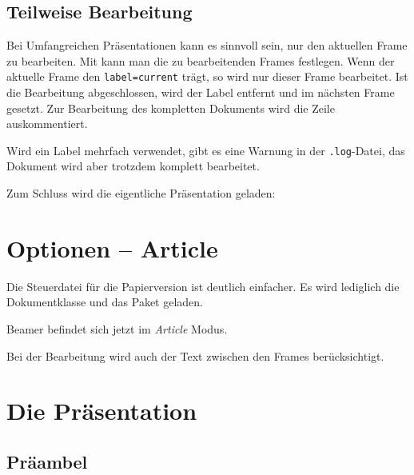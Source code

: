 \subsection{Teilweise Bearbeitung}

Bei Umfangreichen Präsentationen kann es sinnvoll sein, nur den aktuellen
Frame zu bearbeiten.  Mit  kann man die zu
bearbeitenden Frames festlegen.  Wenn der aktuelle Frame den
\texttt{label=current} trägt, so wird nur dieser Frame bearbeitet.  Ist die
Bearbeitung abgeschlossen, wird der Label entfernt und im nächsten Frame
gesetzt.  Zur Bearbeitung des kompletten Dokuments wird die Zeile
auskommentiert.

Wird ein Label mehrfach verwendet, gibt es eine Warnung in der
\texttt{.log}-Datei, das Dokument wird aber trotzdem komplett bearbeitet.

\begin{lfgwcode}{}
\end{lfgwcode}

Zum Schluss wird die eigentliche Präsentation geladen:

\begin{lfgwcode}{}

\end{lfgwcode}

\section{Optionen -- Article}

Die Steuerdatei für die Papierversion ist deutlich einfacher. Es wird
lediglich die Dokumentklasse und das Paket  geladen.

Beamer befindet sich jetzt im \textit{Article} Modus. 

Bei der Bearbeitung wird auch der Text zwischen den Frames berücksichtigt.


\section{Die Präsentation}

\subsection{Präambel}

